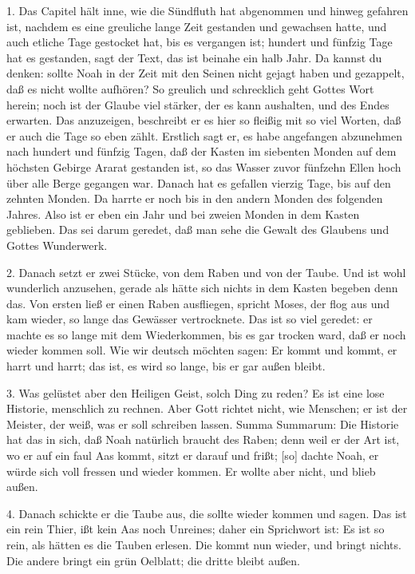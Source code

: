 1. Das Capitel hält inne, wie die Sündfluth hat abgenommen und hinweg gefahren ist, nachdem es eine greuliche lange Zeit gestanden und gewachsen hatte, und auch etliche Tage gestocket hat, bis es vergangen ist; hundert und fünfzig Tage hat es gestanden, sagt der Text, das ist beinahe ein halb Jahr. Da kannst du denken: sollte Noah in der Zeit mit den Seinen nicht gejagt haben und gezappelt, daß es nicht wollte aufhören? So greulich und schrecklich geht Gottes Wort herein; noch ist der Glaube viel stärker, der es kann aushalten, und des Endes erwarten. Das anzuzeigen, beschreibt er es hier so fleißig mit so viel Worten, daß er auch die Tage so eben zählt. Erstlich sagt er, es habe angefangen abzunehmen nach hundert und fünfzig Tagen, daß der Kasten im siebenten Monden auf dem höchsten Gebirge Ararat gestanden ist, so das Wasser zuvor fünfzehn Ellen hoch über alle Berge gegangen war. Danach hat es gefallen vierzig Tage, bis auf den zehnten Monden. Da harrte er noch bis in den andern Monden des folgenden Jahres. Also ist er eben ein Jahr und bei zweien Monden in dem Kasten geblieben. Das sei darum geredet, daß man sehe die Gewalt des Glaubens und Gottes Wunderwerk.

2. Danach setzt er zwei Stücke, von dem Raben und von der Taube. Und ist wohl wunderlich anzusehen, gerade als hätte sich nichts in dem Kasten begeben denn das. Von ersten ließ er einen Raben ausfliegen, spricht Moses, der flog aus und kam wieder, so lange das Gewässer vertrocknete. Das ist so viel geredet: er machte es so lange mit dem Wiederkommen, bis es gar trocken ward, daß er noch wieder kommen soll. Wie wir deutsch möchten sagen: Er kommt und kommt, er harrt und harrt; das ist, es wird so lange, bis er gar außen bleibt.

3. Was gelüstet aber den Heiligen Geist, solch Ding zu reden? Es ist eine lose Historie, menschlich zu rechnen. Aber Gott richtet nicht, wie Menschen; er ist der Meister, der weiß, was er soll schreiben lassen. Summa Summarum: Die Historie hat das in sich, daß Noah natürlich braucht des Raben; denn weil er der Art ist, wo er auf ein faul Aas kommt, sitzt er darauf und frißt; [so] dachte Noah, er würde sich voll fressen und wieder kommen. Er wollte aber nicht, und blieb außen.

4. Danach schickte er die Taube aus, die sollte wieder kommen und sagen. Das ist ein rein Thier, ißt kein Aas noch Unreines; daher ein Sprichwort ist: Es ist so rein, als hätten es die Tauben erlesen. Die kommt nun wieder, und bringt nichts. Die andere bringt ein grün Oelblatt; die dritte bleibt außen.

